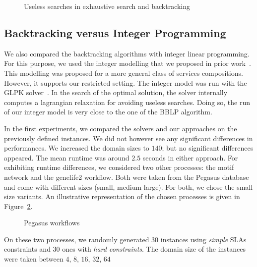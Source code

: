 \documentclass[a4paper]{article}
\begin{document}
\begin{figure}[ht]
\centering
{}

\caption{Useless searches in exhaustive search and backtracking}
\label{UselessExh}
\end{figure}

\subsection{Backtracking versus Integer Programming}

We also compared the backtracking algorithms with integer linear programming. For this 
purpose, we used the integer modelling that we proposed in prior work~\cite{JISA}. This modelling 
was proposed for a more general class of services compositions. However, it supports our 
restricted setting. The integer model was run with the GLPK solver~\cite{GLPK}. In the search of 
the optimal solution, the solver internally computes a lagrangian relaxation for avoiding useless searches. 
Doing so, the run of our integer model is very close to the one of the BBLP algorithm.

In the first experiments, we compared the solvers and our approaches on the previously defined 
instances. We did not however see any significant differences in performances. We increased 
the domain sizes to $140$; but no significant differences appeared. The mean runtime was around $2.5$ seconds 
in either approach. For exhibiting runtime differences, we considered two other processes: the motif 
network and the genelife2 workflow. Both were taken from the Pegasus database~\cite{Pegasus} and come with 
different sizes (small, medium large). For both, we chose the small size variants. An illustrative representation 
of the chosen processes is given in Figure~\ref{Workflow}. 

\begin{figure}[ht]
\centering
{}

\caption{Pegasus workflows}
\label{Workflow}
\end{figure}

On these two processes, we randomly generated $30$ instances using {\it simple} SLAs constraints and 
 $30$ ones with {\it hard constraints}. The domain size of the instances were taken between $4$, $8$, $16$, $32$, $64$
\end{document}
